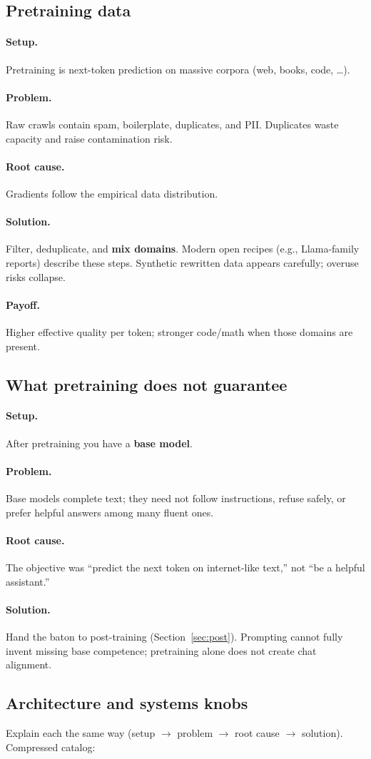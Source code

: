 \documentclass[11pt,a4paper]{article}
\newcommand{\layer}[1]{\paragraph{#1.}}
\newcommand{\setup}{\layer{Setup}}
\newcommand{\problem}{\layer{Problem}}
\newcommand{\rootcause}{\layer{Root cause}}
\newcommand{\solution}{\layer{Solution}}
\newcommand{\payoff}{\layer{Payoff}}
\begin{document}
\subsection{Pretraining data}
\label{sec:data}

\setup
Pretraining is next-token prediction on massive corpora (web, books, code, \ldots).

\problem
Raw crawls contain spam, boilerplate, duplicates, and PII.
Duplicates waste capacity and raise contamination risk.

\rootcause
Gradients follow the empirical data distribution.

\solution
Filter, deduplicate, and \textbf{mix domains}.
Modern open recipes (e.g., Llama-family reports) describe these steps.
Synthetic rewritten data appears carefully; overuse risks collapse.

\payoff
Higher effective quality per token; stronger code/math when those domains are present.

\subsection{What pretraining does not guarantee}
\label{sec:pretrain-limits}

\setup
After pretraining you have a \textbf{base model}.

\problem
Base models complete text; they need not follow instructions, refuse safely, or prefer helpful answers among many fluent ones.

\rootcause
The objective was ``predict the next token on internet-like text,'' not ``be a helpful assistant.''

\solution
Hand the baton to post-training (Section~\ref{sec:post}).
Prompting cannot fully invent missing base competence; pretraining alone does not create chat alignment.

\subsection{Architecture and systems knobs}
\label{sec:arch-sys}

Explain each the same way (setup $\to$ problem $\to$ root cause $\to$ solution).
Compressed catalog:
\end{document}
